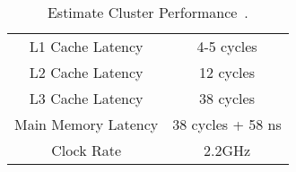 \begin{table}
	\centering
	\begin{tabular}{cc}
		L1 Cache Latency & 4-5 cycles \\
		L2 Cache Latency & 12 cycles \\
		L3 Cache Latency & 38 cycles \\
		Main Memory Latency & 38 cycles + 58 ns \\
		Clock Rate & 2.2GHz \\
	\end{tabular}
	\caption{Estimate Cluster Performance~\cite{7cpu:-:Bradwell}.}
	\label{tab:models-baseLatencies}
\end{table}